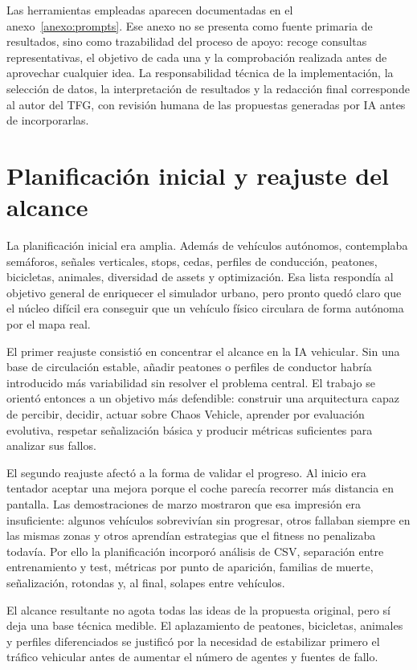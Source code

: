 Las herramientas empleadas aparecen documentadas en el anexo~\ref{anexo:prompts}. Ese anexo no se presenta como fuente primaria de resultados, sino como trazabilidad del proceso de apoyo: recoge consultas representativas, el objetivo de cada una y la comprobación realizada antes de aprovechar cualquier idea. La responsabilidad técnica de la implementación, la selección de datos, la interpretación de resultados y la redacción final corresponde al autor del TFG, con revisión humana de las propuestas generadas por IA antes de incorporarlas.

\section{Planificación inicial y reajuste del alcance}

La planificación inicial era amplia. Además de vehículos autónomos, contemplaba semáforos, señales verticales, stops, cedas, perfiles de conducción, peatones, bicicletas, animales, diversidad de assets y optimización. Esa lista respondía al objetivo general de enriquecer el simulador urbano, pero pronto quedó claro que el núcleo difícil era conseguir que un vehículo físico circulara de forma autónoma por el mapa real.

El primer reajuste consistió en concentrar el alcance en la IA vehicular. Sin una base de circulación estable, añadir peatones o perfiles de conductor habría introducido más variabilidad sin resolver el problema central. El trabajo se orientó entonces a un objetivo más defendible: construir una arquitectura capaz de percibir, decidir, actuar sobre Chaos Vehicle, aprender por evaluación evolutiva, respetar señalización básica y producir métricas suficientes para analizar sus fallos.

El segundo reajuste afectó a la forma de validar el progreso. Al inicio era tentador aceptar una mejora porque el coche parecía recorrer más distancia en pantalla. Las demostraciones de marzo mostraron que esa impresión era insuficiente: algunos vehículos sobrevivían sin progresar, otros fallaban siempre en las mismas zonas y otros aprendían estrategias que el fitness no penalizaba todavía. Por ello la planificación incorporó análisis de CSV, separación entre entrenamiento y test, métricas por punto de aparición, familias de muerte, señalización, rotondas y, al final, solapes entre vehículos.

El alcance resultante no agota todas las ideas de la propuesta original, pero sí deja una base técnica medible. El aplazamiento de peatones, bicicletas, animales y perfiles diferenciados se justificó por la necesidad de estabilizar primero el tráfico vehicular antes de aumentar el número de agentes y fuentes de fallo.

